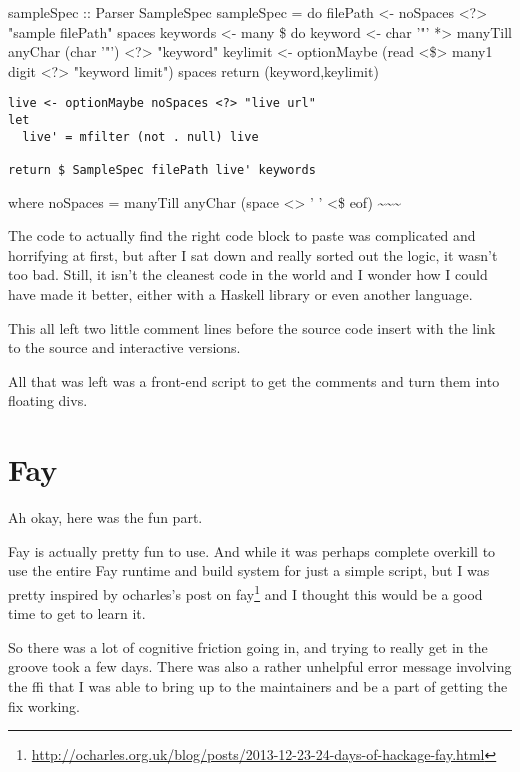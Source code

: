 \documentclass[]{article}
\renewcommand{\href}[2]{#2\footnote{\url{#1}}}
\begin{document}
sampleSpec :: Parser SampleSpec sampleSpec = do filePath \textless{}- noSpaces
\textless{}?\textgreater{} "sample filePath" spaces keywords \textless{}- many
\$ do keyword \textless{}- char '"' *\textgreater{} manyTill anyChar (char '"')
\textless{}?\textgreater{} "keyword" keylimit \textless{}- optionMaybe (read
\textless{}\$\textgreater{} many1 digit \textless{}?\textgreater{} "keyword
limit") spaces return (keyword,keylimit)

\begin{verbatim}
live <- optionMaybe noSpaces <?> "live url"
let
  live' = mfilter (not . null) live

return $ SampleSpec filePath live' keywords
\end{verbatim}

where noSpaces = manyTill anyChar (space \textless{}\textbar{}\textgreater{} ' '
\textless{}\$ eof) \textasciitilde{}\textasciitilde{}\textasciitilde{}

The code to actually find the right code block to paste was complicated and
horrifying at first, but after I sat down and really sorted out the logic, it
wasn't too bad. Still, it isn't the cleanest code in the world and I wonder how
I could have made it better, either with a Haskell library or even another
language.

This all left two little comment lines before the source code insert with the
link to the source and interactive versions.

All that was left was a front-end script to get the comments and turn them into
floating divs.

\section{Fay}

Ah okay, here was the fun part.

Fay is actually pretty fun to use. And while it was perhaps complete overkill to
use the entire Fay runtime and build system for just a simple script, but I was
pretty inspired by
\href{http://ocharles.org.uk/blog/posts/2013-12-23-24-days-of-hackage-fay.html}{ocharles's
post on fay} and I thought this would be a good time to get to learn it.

So there was a lot of cognitive friction going in, and trying to really get in
the groove took a few days. There was also a rather unhelpful error message
involving the ffi that I was able to bring up to the maintainers and be a part
of getting the fix working.
\end{document}
